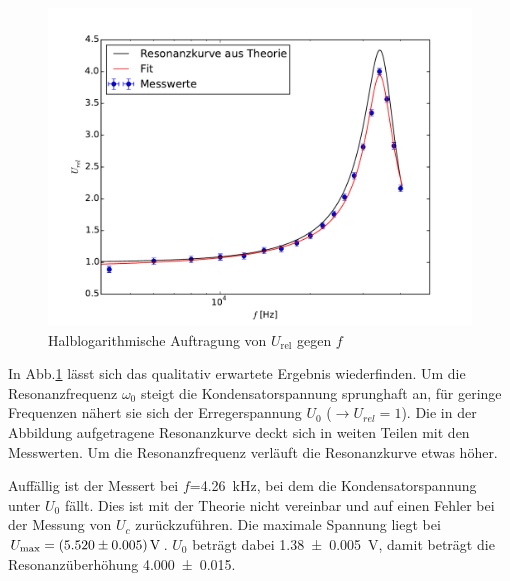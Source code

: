 \begin{figure}[H]
  \centering
  \includegraphics[width=\textwidth]{5cfit.pdf}
  \caption{Halblogarithmische Auftragung von $U_\text{rel}$ gegen $f$}
  \label{fig:5cergebnis}
\end{figure}
In Abb.\ref{fig:5cergebnis} lässt sich das qualitativ erwartete Ergebnis
wiederfinden. Um die Resonanzfrequenz $\omega_0$ steigt die Kondensatorspannung
sprunghaft an, für geringe Frequenzen nähert sie sich der Erregerspannung $U_0$
($\rightarrow U_{rel}=1$). Die in der Abbildung aufgetragene Resonanzkurve
deckt sich in weiten Teilen mit den Messwerten. Um die Resonanzfrequenz verläuft
die Resonanzkurve etwas höher.

Auffällig ist der Messert bei $f$=\SI{4.26}{\kilo\hertz},
bei dem die Kondensatorspannung unter
$U_0$ fällt. Dies ist mit der Theorie nicht vereinbar und auf einen
Fehler bei der Messung von $U_c$ zurückzuführen. Die maximale Spannung liegt
bei $U_\text{max} = \SI{5.52 +- 0.005}{\volt}$. $U_0$ beträgt dabei \SI{1.38 +- 0.005}
{\volt}, damit beträgt die Resonanzüberhöhung \num{4.000 +- 0.015}.

